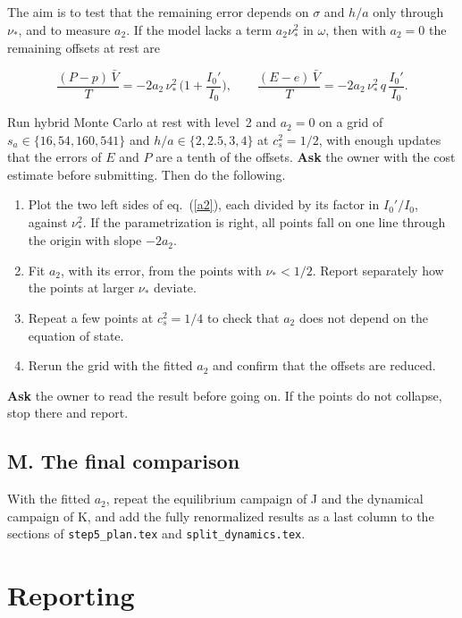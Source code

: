 \documentclass[11pt,aps,preprint,nofootinbib,superscriptaddress,tightenlines]{revtex4-2}
\def\st{\begin{equation}}
\def\stp{\end{equation}}
\def\Eq#1{eq.~(\ref{#1})}
\begin{document}
The aim is to test that the remaining error depends on $\sigma$ and $h/a$ only through $\nu_*$, and to measure $a_2$.  If the model lacks a term
$a_2\nu_*^2$ in $\omega$, then with $a_2=0$ the remaining offsets at rest are
\begin{keyeq}
\st
\frac{(P-p)\,\bar V}{T}=-2a_2\,\nu_*^2\,\Big(1+\frac{I_0'}{I_0}\Big),\qquad
\frac{(E-e)\,\bar V}{T}=-2a_2\,\nu_*^2\,q\,\frac{I_0'}{I_0} .
\label{a2}
\stp
\end{keyeq}
Run hybrid Monte Carlo at rest with level~2 and $a_2=0$ on a grid of $s_a\in\{16,54,160,541\}$ and $h/a\in\{2,2.5,3,4\}$ at $c_s^2=1/2$, with enough
updates that the errors of $E$ and $P$ are a tenth of the offsets.  \textbf{Ask} the owner with the cost estimate before submitting.  Then do the
following.
\begin{enumerate}
\item Plot the two left sides of \Eq{a2}, each divided by its factor in $I_0'/I_0$, against $\nu_*^2$.  If the parametrization is right, all points
  fall on one line through the origin with slope $-2a_2$.
\item Fit $a_2$, with its error, from the points with $\nu_*<1/2$.  Report separately how the points at larger $\nu_*$ deviate.
\item Repeat a few points at $c_s^2=1/4$ to check that $a_2$ does not depend on the equation of state.
\item Rerun the grid with the fitted $a_2$ and confirm that the offsets are reduced.
\end{enumerate}
\textbf{Ask} the owner to read the result before going on.  If the points do not collapse, stop there and report.

\subsection{M. The final comparison}

With the fitted $a_2$, repeat the equilibrium campaign of J and the dynamical campaign of K, and add the fully renormalized results as a last column to
the sections of \nolinkurl{step5_plan.tex} and \nolinkurl{split_dynamics.tex}.

\section{Reporting}
\label{sec:reporting}
\end{document}

